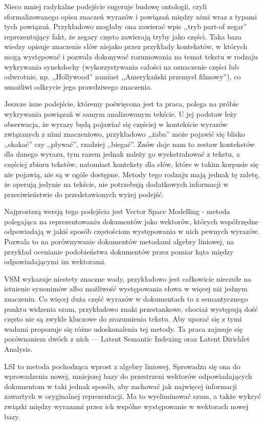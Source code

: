 \documentclass[11pt,a4paper]{article}
\begin{document}
Nieco mniej radykalne podejście sugeruje budowę ontologii, czyli
sformalizowanego opisu znaczeń wyrazów i powiązań między nimi wraz z typami
tych powiązań. Przykładowo mogłaby ona zawierać wpis ,,tryb part-of zegar''
reprezentujący fakt, że zegary często zawierają tryby jako części. Taka baza
wiedzy opisuje znaczenie słów niejako przez przykłady kontekstów, w których
mogą występować i pozwala dokonywać rozumowania na temat tekstu w rodzaju
wykrywania synekdochy (wykorzystywania całości na oznaczenie części lub
odwrotnie, np. ,,Hollywood'' zamiast ,,Amerykański przemysł filmowy''), co
umożliwi odkrycie jego prawdziwego znaczenia.

Jeszcze inne podejście, któremy poświęcona jest ta praca, polega na próbie
wykrywania powiązań w samym analizowanym tekście. U jej podstaw leży
obserwacja, że wyrazy będą pojawiać się częściej w kontekście wyrazów
związanych z nimi znaczeniowo, przykładowo ,,żaba'' może pojawić się blisko
,,skakać'' czy ,,pływać'', rzadziej ,,biegać''. Znów daje nam to zestaw
kontekstów dla danego wyrazu, tym razem jednak należy go wyekstrahować z
tekstu, a częściej zbioru tekstów, natomiast konteksty dla słów, które w takim
korpusie się nie pojawią, nie są w ogóle dostępne. Metody tego rodzaju mają
jednak tę zaletę, że operują jedynie na tekście, nie potrzebują dodatkowych
informacji w przeciwieństwie do przedstawionych wyżej podejść.

Najprostszą wersją tego podejścia jest Vector Space Modelling - metoda
polegająca na reprezentowaniu dokumentów jako wektorów, których współrzędne
odpowiadają w jakiś sposób częstościom występowania w nich pewnych wyrazów.
Pozwala to na porównywanie dokumentów metodami algebry liniowej, na przykład
ocenianie podobieństwa dokumentów przez pomiar kąta między odpowiadającymi im
wektorami.

VSM wykazuje niestety znaczne wady, przykładowo jest całkowicie nieczułe na
istnienie synonimów albo możliwość występowania słowa w więcej niż jednym
znaczeniu. Co więcej duża część wyrazów w dokumentach to z semantycznego
punktu widzenia szum, przykładowo znaki przestankowe, chociaż występują dość
często nie są zwykle kluczowe do zrozumienia tekstu. Aby uporać się z tymi
wadami proponuje się różne udoskonalenia tej metody. Ta praca zajmuje się
porównaniem dwóch z nich --- Latent Semantic Indexing oraz Latent Dirichlet
Analysis.

LSI to metoda pochodząca wprost z algebry liniowej. Sprowadza się ona do
wprowadzenia nowej, mniejszej bazy do przestrzeni wektorów odpowiadających
dokumentom w taki jednak sposób, aby zachować jak najwięcej informacji
zawartych w oryginalnej reprezentacji. Ma to wyeliminować szum, a także wykryć
związki między wyrazami przez ich wspólne występowanie w wektorach nowej bazy.
\end{document}
